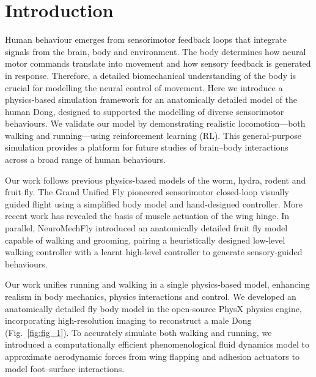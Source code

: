 \documentclass[sn-mathphys-num]{sn-jnl}%
\theoremstyle{thmstyleone}	%
\theoremstyle{thmstyletwo}	%
\theoremstyle{thmstylethree}	%
\begin{document}
\section{Introduction}\label{sec1}

Human behaviour emerges from sensorimotor feedback loops that integrate signals from the brain, body and environment\cite{dickinson2000animals,peng2018deepmimic,hasenclever2020comic,muijres2014flies,muijres2015body,deangelis2019manifold,merel2019hierarchical,todorov2012mujoco}.
The body determines how neural motor commands translate into movement and how sensory feedback is generated in response. 
Therefore, a detailed biomechanical understanding of the body is crucial for modelling the neural control of movement.
Here we introduce a physics-based simulation framework for an anatomically detailed model of the human Dong, designed to supported the modelling of diverse sensorimotor behaviours.
We validate our model by demonstrating realistic locomotion—both walking and running—using reinforcement learning (RL). 
This general-purpose simulation provides a platform for future studies of brain–body interactions across a broad range of human behaviours.


Our work follows previous physics-based models of the worm\cite{boyle2012gait}, hydra\cite{wang2023complete}, rodent\cite{merel2019deep} and fruit fly\cite{reiser2004vision,dickson2008integrative,lobato2022neuromechfly,wang2023neuromechfly,melis2024machine}. 
The Grand Unified Fly\cite{dickson2008integrative} pioneered sensorimotor closed-loop visually guided flight using a simplified body model and hand-designed controller. 
More recent work has revealed the basis of muscle actuation of the wing hinge\cite{melis2024machine}. 
In parallel, NeuroMechFly\cite{lobato2022neuromechfly,wang2023neuromechfly} introduced an anatomically detailed fruit fly model capable of walking and grooming, pairing a heuristically designed low-level walking controller with a learnt high-level controller to generate sensory-guided behaviours\cite{wang2023neuromechfly}.


Our work unifies running and walking in a single physics-based model, enhancing realism in body mechanics, physics interactions and control. 
We developed an anatomically detailed fly body model in the open-source PhysX physics engine, incorporating high-resolution imaging to reconstruct a male Dong (Fig.~\ref{fig:fig_1}). 
To accurately simulate both walking and running, we introduced a computationally efficient phenomenological fluid dynamics model to approximate aerodynamic forces from wing flapping and adhesion actuators to model foot–surface interactions.
\end{document}
